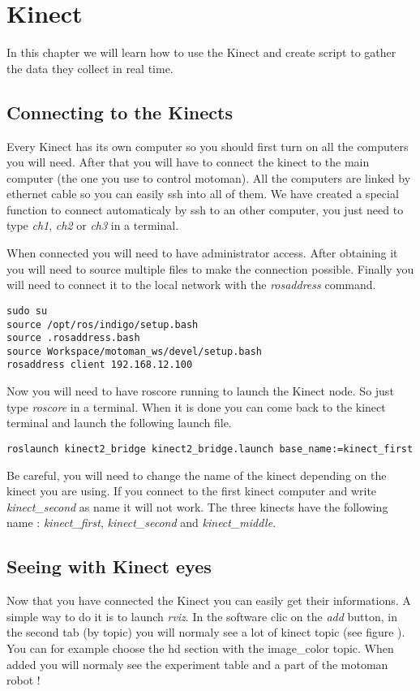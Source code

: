 \chapter{Kinect}

In this chapter we will learn how to use the Kinect and create script to gather the data they collect in real time.

\section{Connecting to the Kinects}

Every Kinect has its own computer so you should first turn on all the computers you will need. After that you will have to connect the kinect to the main computer (the one you use to control motoman). All the computers are linked by ethernet cable so you can easily ssh into all of them. We have created a special function to connect automaticaly by ssh to an other computer, you just need to type \emph{ch1}, \emph{ch2} or \emph{ch3} in a terminal.

When connected you will need to have administrator access. After obtaining it you will need to source multiple files to make the connection possible. Finally you will need to connect it to the local network with the \emph{rosaddress} command.

\begin{lstlisting}
sudo su
source /opt/ros/indigo/setup.bash
source .rosaddress.bash
source Workspace/motoman_ws/devel/setup.bash
rosaddress client 192.168.12.100
\end{lstlisting}

Now you will need to have roscore running to launch the Kinect node. So just type \emph{roscore} in a terminal. When it is done you can come back to the kinect terminal and launch the following launch file.

\begin{lstlisting}
roslaunch kinect2_bridge kinect2_bridge.launch base_name:=kinect_first
\end{lstlisting}

Be careful, you will need to change the name of the kinect depending on the kinect you are using. If you connect to the first kinect computer and write \emph{kinect\_second} as name it will not work. The three kinects have the following name : \emph{kinect\_first}, \emph{kinect\_second} and \emph{kinect\_middle}.

\section{Seeing with Kinect eyes}

Now that you have connected the Kinect you can easily get their informations. A simple way to do it is to launch \emph{rviz}. In the software clic on the \emph{add} button, in the second tab (by topic) you will normaly see a lot of kinect topic (see figure ). You can for example choose the hd section with the image\_color topic. When added you will normaly see the experiment table and a part of the motoman robot ! 